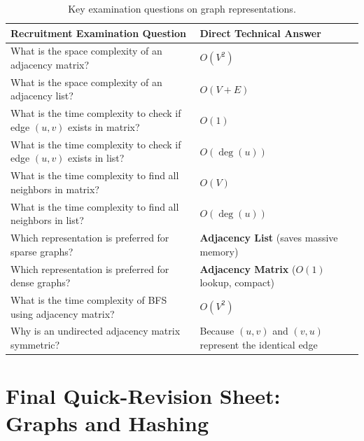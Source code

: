 \begin{table}[htbp]
\centering
\small
\begin{tabularx}{\textwidth}{p{8cm} X}
\toprule
\textbf{Recruitment Examination Question} & \textbf{Direct Technical Answer} \\
\midrule
What is the space complexity of an adjacency matrix? & $O(V^2)$ \\
What is the space complexity of an adjacency list? & $O(V + E)$ \\
What is the time complexity to check if edge $(u,v)$ exists in matrix? & $O(1)$ \\
What is the time complexity to check if edge $(u,v)$ exists in list? & $O(\deg(u))$ \\
What is the time complexity to find all neighbors in matrix? & $O(V)$ \\
What is the time complexity to find all neighbors in list? & $O(\deg(u))$ \\
Which representation is preferred for sparse graphs? & \textbf{Adjacency List} (saves massive memory) \\
Which representation is preferred for dense graphs? & \textbf{Adjacency Matrix} ($O(1)$ lookup, compact) \\
What is the time complexity of BFS using adjacency matrix? & $O(V^2)$ \\
Why is an undirected adjacency matrix symmetric? & Because $(u, v)$ and $(v, u)$ represent the identical edge \\
\bottomrule
\end{tabularx}
\caption{Key examination questions on graph representations.}
\end{table}

\section{Final Quick-Revision Sheet: Graphs and Hashing}

